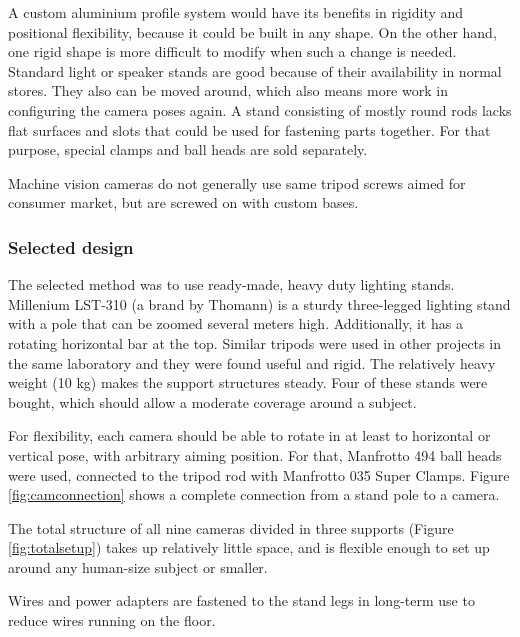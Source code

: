 A custom aluminium profile system would have its benefits in rigidity and positional flexibility, because it could be built in any shape.
On the other hand, one rigid shape is more difficult to modify when such a change is needed.
Standard light or speaker stands are good because of their availability in normal stores.
They also can be moved around, which also means more work in configuring the camera poses again.
A stand consisting of mostly round rods lacks flat surfaces and slots that could be used for fastening parts together.
For that purpose, special clamps and ball heads are sold separately.

Machine vision cameras do not generally use same tripod screws aimed for consumer market, but are screwed on with custom bases.

\subsubsection{Selected design}

The selected method was to use ready-made, heavy duty lighting stands.
Millenium LST-310 (a brand by Thomann) is a sturdy three-legged lighting stand with a pole that can be zoomed several meters high.
Additionally, it has a rotating horizontal bar at the top.
Similar tripods were used in other projects in the same laboratory and they were found useful and rigid.
The relatively heavy weight (10 kg) makes the support structures steady. %
Four of these stands were bought, which should allow a moderate coverage around a subject. %

For flexibility, each camera should be able to rotate in at least to horizontal or vertical pose, with arbitrary aiming position.
For that, Manfrotto 494 ball heads were used, connected to the tripod rod with Manfrotto 035 Super Clamps.
Figure \ref{fig:camconnection} shows a complete connection from a stand pole to a camera.

The total structure of all nine cameras divided in three supports (Figure \ref{fig:totalsetup}) takes up relatively little space, and is flexible enough to set up around any human-size subject or smaller.

Wires and power adapters are fastened to the stand legs in long-term use to reduce wires running on the floor.


